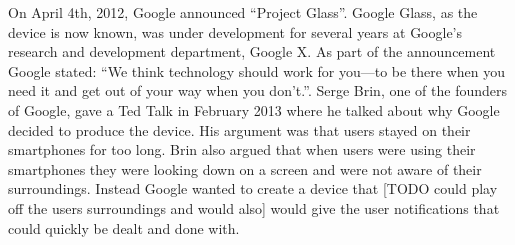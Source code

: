 








On April 4th, 2012, Google announced ``Project Glass''.\cite{GoogleGlassConcept} Google Glass, as the device is now known, was under development for several years at Google's research and development department, Google X. As part of the announcement Google stated:  ``We think technology should work for you---to be there when you need it and get out of your way when you don’t.''.\cite{GoogleGlassAnnouncement} Serge Brin, one of the founders of Google, gave a Ted Talk in February 2013\cite{tedtalkWhyGlass} where he talked about why Google decided to produce the device. His argument was that users stayed on their smartphones for too long. Brin also argued that when users were using their smartphones they were looking down on a screen and were not aware of their surroundings. Instead Google wanted to create a device that [TODO could play off the users surroundings and would also] would give the user notifications that could quickly be dealt and done with.\\

